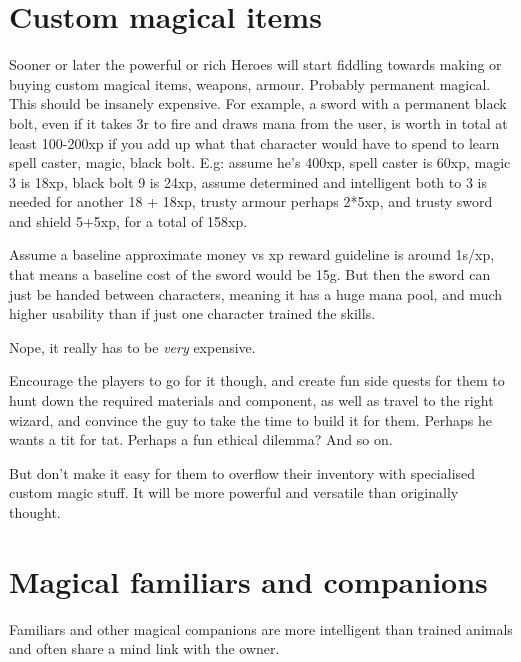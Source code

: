 
\section*{Custom magical items}
Sooner or later the powerful or rich Heroes will start fiddling towards making or buying custom magical items, weapons, armour. Probably permanent magical. This should be insanely expensive. For example, a sword with a permanent black bolt, even if it takes 3r to fire and draws mana from the user, is worth in total at least 100-200xp if you add up what that character would have to spend to learn spell caster, magic, black bolt. E.g: assume he's 400xp, spell caster is 60xp, magic 3 is 18xp, black bolt 9 is 24xp, assume determined and intelligent both to 3 is needed for another 18 + 18xp, trusty armour perhaps 2*5xp, and trusty sword and shield 5+5xp, for a total of 158xp.

Assume a baseline approximate money vs xp reward guideline is around 1s/xp, that means a baseline cost of the sword would be 15g. But then the sword can just be handed between characters, meaning it has a huge mana pool, and much higher usability than if just one character trained the skills.

Nope, it really has to be \emph{very} expensive.

Encourage the players to go for it though, and create fun side quests for them to hunt down the required materials and component, as well as travel to the right wizard, and convince the guy to take the time to build it for them. Perhaps he wants a tit for tat. Perhaps a fun ethical dilemma? And so on.

But don't make it easy for them to overflow their inventory with specialised custom magic stuff. It will be more powerful and versatile than originally thought.







\section*{Magical familiars and companions}
Familiars and other magical companions are more intelligent than trained animals and often share a mind link with the owner.

